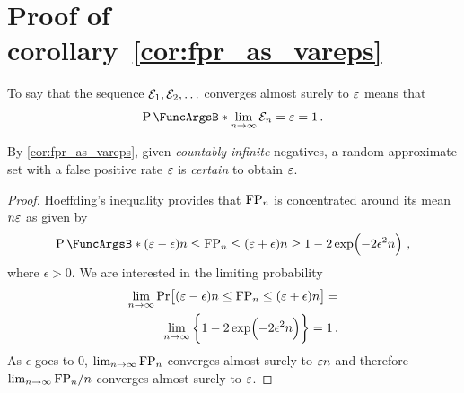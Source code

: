 \documentclass[10pt,final,hidelinks]{article}
\numberwithin{equation}{section}
\begin{document}
\appendices
{

\section{Proof of corollary~\ref{cor:fpr_as_vareps}}
\label{app:cor_fpr_as_vareps}
To say that the sequence $\mathcal{E}_1,\mathcal{E}_2,\ldots$ converges almost surely to $\varepsilon$ means that
\begin{equation}
\Prob{\lim _{n \to \infty} \FPR_n = \fprate} = 1\,.
\end{equation}

By \cref{cor:fpr_as_vareps}, given \emph{countably infinite} negatives, a random approximate set with a false positive rate $\varepsilon$ is \emph{certain} to obtain $\varepsilon$.
\begin{proof}
Hoeffding's inequality\cite{hoeffding} provides that $\mathrm{FP}_n$ is concentrated around its mean $n \varepsilon$ as given by
\begin{equation}
\Prob{(\fprate -\epsilon) n \leq \FP_n \leq (\fprate + \epsilon )n}
\geq 1 - 2 \exp\!\left(-2\epsilon ^{2} n\right)\,,
\end{equation}
where $\epsilon > 0$.
We are interested in the limiting probability
\begin{equation}
\begin{split}
\lim_{n \to \infty} \Pr\!\left[(\varepsilon -\epsilon) n \leq 
\mathrm{FP}_n \leq (\varepsilon + \epsilon)n\right] =\\
\lim_{n \to \infty} \left\{ 1 - 
2 \exp\!\left(-2\epsilon ^{2} n\right) \right\} = 1\,.
\end{split}
\end{equation}
As $\epsilon$ goes to $0$, $\lim_{n \to \infty} \mathrm{FP}_n$ converges almost surely to $\varepsilon n$ and therefore $\lim_{n \to \infty} \mathrm{FP}_n / n$ converges almost surely to $\varepsilon$.
\end{proof}

}
\end{document}
